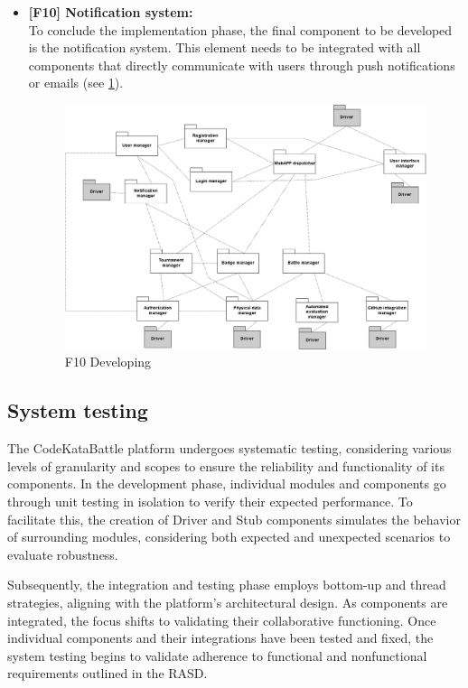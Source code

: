 \begin{itemize}
    \item \textbf{[F10] Notification system:} \\
    To conclude the implementation phase, the final component to be developed is the notification system. This element needs to be integrated with all components that directly communicate with users through push notifications or emails  (see \ref{fig:T_F10}).
        \begin{figure}[H]
            \centering
            \includegraphics[width=\linewidth]{Images/T_F10.png}
            \caption{F10 Developing}
            \label{fig:T_F10}
        \end{figure}
    
\end{itemize}


\newpage

\subsection{System testing}

The CodeKataBattle platform undergoes systematic testing, considering various levels of granularity and scopes to ensure the reliability and functionality of its components. In the development phase, individual modules and components go through unit testing in isolation to verify their expected performance. To facilitate this, the creation of Driver and Stub components simulates the behavior of surrounding modules, considering both expected and unexpected scenarios to evaluate robustness.

Subsequently, the integration and testing phase employs bottom-up and thread strategies, aligning with the platform's architectural design. As components are integrated, the focus shifts to validating their collaborative functioning. Once individual components and their integrations have been tested and fixed, the system testing begins to validate adherence to functional and nonfunctional requirements outlined in the RASD.


